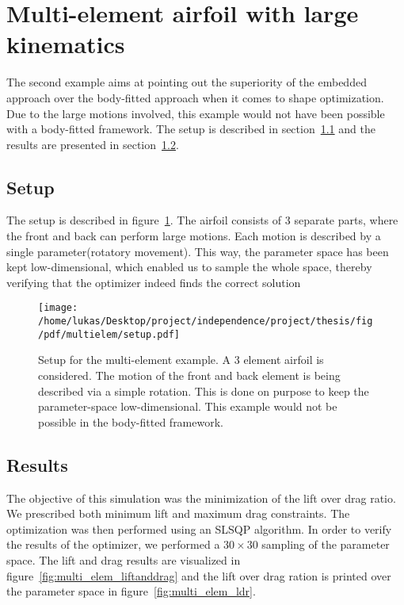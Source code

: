 \documentclass[../main.tex]{subfiles}
\begin{document}


\section{Multi-element airfoil with large kinematics}\label{sec:example_multielem}

The second example aims at pointing out the superiority of the embedded approach over the body-fitted approach when it comes to shape optimization. Due to the large motions involved, this example would not have been possible with a body-fitted framework. The setup is described in section~\ref{sec:multielem_setup} and the results are presented in section~\ref{sec:multielem_results}.

\subsection{Setup}\label{sec:multielem_setup}

The setup is described in figure~\ref{fig:multi_elem_setup}. The airfoil consists of 3 separate parts, where the front and back can perform large motions. Each motion is described by a single parameter(rotatory movement). This way, the parameter space has been kept low-dimensional, which enabled us to sample the whole space, thereby verifying that the optimizer indeed finds the correct solution

\begin{figure}[t!]
    \centering
    	\texttt{[image: /home/lukas/Desktop/project/independence/project/thesis/fig/pdf/multielem/setup.pdf]}
    	\caption[Multi-element example: setup]{Setup for the multi-element example. A 3 element airfoil is considered. The motion of the front and back element is being described via a simple rotation. This is done on purpose to keep the parameter-space low-dimensional. This example would not be possible in the body-fitted framework.}
    	\label{fig:multi_elem_setup}
\end{figure}


\subsection{Results}\label{sec:multielem_results}
The objective of this simulation was the minimization of the lift over drag ratio. We prescribed both minimum lift and maximum drag constraints. The optimization was then performed using an \ac{SLSQP} algorithm. In order to verify the results of the optimizer, we performed a $30\times30$ sampling of the parameter space. The lift and drag results are visualized in figure~\ref{fig:multi_elem_liftanddrag} and the lift over drag ration is printed over the parameter space in figure~\ref{fig:multi_elem_ldr}.
\end{document}

